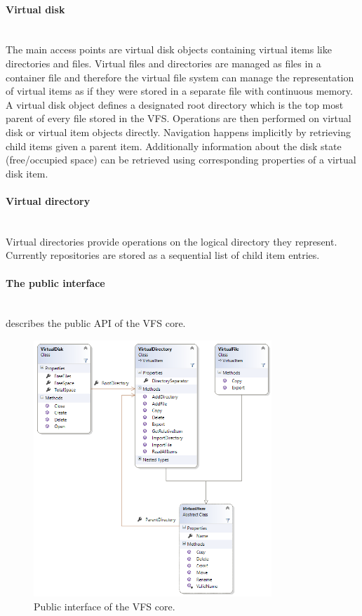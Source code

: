\documentclass{scrartcl}
\begin{document}
\paragraph{Virtual disk} \ \\
The main access points are virtual disk objects containing virtual items like directories and files.
Virtual files and directories are managed as files in a container file and
therefore the virtual file system can manage the representation of virtual
items as if they were stored in a separate file with continuous memory.
A virtual disk object defines a designated root directory which is the top most
parent of every file stored in the VFS.
Operations are then performed on virtual disk or virtual item objects directly.
Navigation happens implicitly by retrieving child items given a parent item.
Additionally information about the disk state (free/occupied space) can be
retrieved using corresponding properties of a virtual disk item.

\paragraph{Virtual directory} \ \\
Virtual directories provide operations on the logical directory they represent. Currently repositories are stored as a sequential list of child item entries.

\paragraph{The public interface} \ \\
 describes the public API of the VFS core.
\begin{figure}[h]
    \centering
        \includegraphics[width=0.8\textwidth]{figures/PublicInterfaceVFSCore}
        \caption{Public interface of the VFS core.}
        \label{fig:coreapi}
\end{figure}
\end{document}
